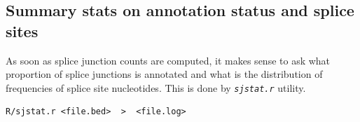 \documentclass{article}
\newcommand{\prog}[1]{{\tt\em #1}}
\begin{document}
\subsection{Summary stats on annotation status and splice sites}
As soon as splice junction counts are computed, it makes sense to ask what proportion of splice junctions is annotated and what is the distribution of
frequencies of splice site nucleotides. This is done by \prog{sjstat.r} utility.
\begin{verbatim}
R/sjstat.r <file.bed>  >  <file.log>
\end{verbatim}



\end{document}
